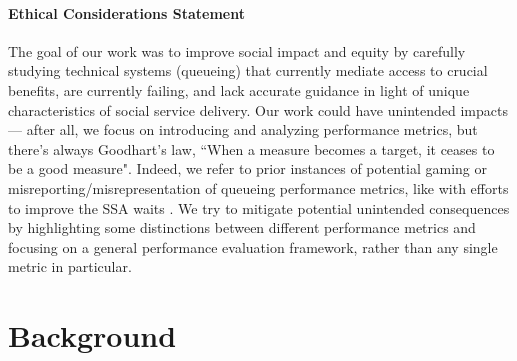 \documentclass[manuscript,screen,authorversion]{acmart}
\begin{document}


\paragraph{Ethical Considerations Statement}

The goal of our work was to improve social impact and equity by carefully studying technical systems (queueing) that currently mediate access to crucial benefits, are currently failing, and lack accurate guidance in light of unique characteristics of social service delivery. Our work could have unintended impacts --- after all, we focus on introducing and analyzing performance metrics, but there's always Goodhart's law, ``When a measure becomes a target, it ceases to be a good measure". Indeed, we refer to prior instances of potential gaming or misreporting/misrepresentation of queueing performance metrics, like with efforts to improve the SSA waits \citep{warren}. We try to mitigate potential unintended consequences by highlighting some distinctions between different performance metrics and focusing on a general performance evaluation framework, rather than any single metric in particular. 

 

\clearpage

\appendix

\section{Background}
\end{document}
